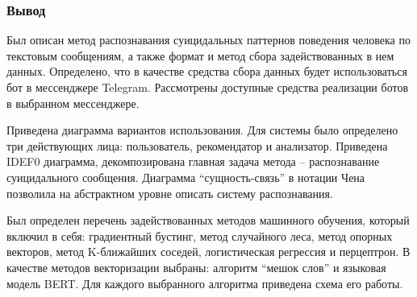 \subsubsection*{Вывод}
Был описан метод распознавания суицидальных паттернов поведения человека по текстовым сообщениям, а также формат и метод сбора задействованных в нем данных. 
Определено, что в качестве средства сбора данных будет использоваться бот в мессенджере Telegram. Рассмотрены доступные средства реализации ботов в выбранном мессенджере.

Приведена диаграмма вариантов использования. Для системы было определено три действующих лица: пользователь, рекомендатор и анализатор. 
Приведена IDEF0 диаграмма, декомпозирована главная задача метода -- распознавание суицидального сообщения. 
Диаграмма ``сущность-связь'' в нотации Чена позволила на абстрактном уровне описать систему распознавания. 

Был определен перечень задействованных методов машинного обучения, который включил в себя: градиентный бустинг, метод случайного леса, метод опорных векторов, метод K-ближайших соседей, логистическая регрессия и перцептрон. 
В качестве методов векторизации выбраны: алгоритм ``мешок слов'' и языковая модель BERT.
Для каждого выбранного алгоритма приведена схема его работы.

\pagebreak